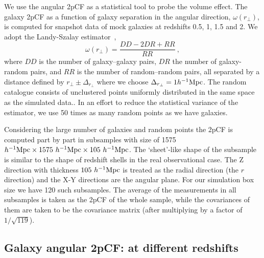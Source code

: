 \documentclass[iop]{emulateapj}
\begin{document}

We use the angular 2pCF as a statistical tool to probe the volume effect.
The galaxy 2pCF as a function of galaxy separation in the angular direction, $\omega(r_\perp)$, is computed for snapshot data of mock galaxies at redshifts 0.5, 1, 1.5 and 2.
We adopt the Landy-Szalay estimator~\citep{1993ApJ...412...64L},
\begin{equation}
\omega(r_\perp)=\frac{DD-2DR+RR}{RR}\ ,
\end{equation}
where $DD$ is the number of galaxy--galaxy pairs, 
$DR$ the number of galaxy-random pairs, 
and $RR$ is the number of random--random pairs, 
all separated by a distance defined by $r_\perp\pm\Delta_{r_\perp}$ where we choose $\Delta_{r_\perp}=1h^{-1}\rm Mpc$.
The random catalogue consists of unclustered points uniformly distributed in the same space as the simulated data.. 
In an effort to reduce the statistical variance of the estimator, we use 50 times as many random points as we have galaxies.

Considering the large number of galaxies and random points the 2pCF is computed part by part in subsamples with 
size of 1575 $h^{-1}{\rm Mpc}\times 1575\ h^{-1}{\rm Mpc}\times 105\ h^{-1}{\rm Mpc}$.
The `sheet'-like shape of the subsample is similar to the shape of redshift shells in the real observational case.
The Z direction with thickness $105\ h^{-1}\rm Mpc$ is treated as the radial direction (the $r$ direction) 
and the X-Y directions %
are the angular plane.
For our simulation box size we have 120 such subsamples.
The average of the measurements in all subsamples is taken as the 2pCF of the whole sample,
while the covariances of them are taken to be the covariance matrix (after multiplying by a factor of $1/\sqrt{119}$).


\subsection{Galaxy angular 2pCF: at different redshifts}\label{sec_2pCF_diffz}
\end{document}
